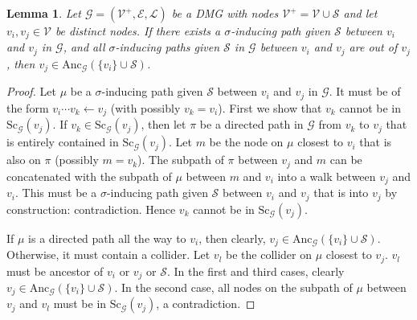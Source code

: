 \documentclass[accepted]{uai2025} %
\newtheorem{lemma}{Lemma}
\newcommand{\anc}{\text{Anc}}
\newcommand{\hut}{\mathrel{\leftarrow}}
\begin{document}
\begin{lemma}\label{lemma12.2.5}
Let $\mathcal{G}=(\mathcal{V}^+,\mathcal{E},\mathcal{L})$ be a DMG with nodes $\mathcal{V}^+=\mathcal{V}\cup\mathcal{S}$ and let $v_i,v_j\in\mathcal{V}$ be distinct nodes. If there exists a $\sigma$-inducing path given $\mathcal{S}$ between $v_i$ and $v_j$ in $\mathcal{G}$, and all $\sigma$-inducing paths given $\mathcal{S}$ in $\mathcal{G}$ between $v_i$ and $v_j$ are out of $v_j$, then $v_j\in \anc_\mathcal{G}(\{v_i\}\cup\mathcal{S})$.
\end{lemma}
\begin{proof}
Let $\mu$ be a $\sigma$-inducing path given $\mathcal{S}$ between $v_i$ and $v_j$ in $\mathcal{G}$. 
It must be of the form $v_i \cdots v_k \hut v_j$ (with possibly $v_k = v_i$). 
First we show that $v_k$ cannot be in $\text{Sc}_\mathcal{G}(v_j)$.
If $v_k \in \text{Sc}_\mathcal{G}(v_j)$, then let $\pi$ be a directed path in $\mathcal{G}$ from $v_k$ to $v_j$ that is entirely contained in $\text{Sc}_\mathcal{G}(v_j)$.
Let $m$ be the node on $\mu$ closest to $v_i$ that is also on $\pi$ (possibly $m = v_k$).
The subpath of $\pi$ between $v_j$ and $m$ can be concatenated with the subpath of $\mu$ between $m$ and $v_i$ into a walk between $v_j$ and $v_i$.
This must be a $\sigma$-inducing path given $\mathcal{S}$ between $v_i$ and $v_j$ that is into $v_j$ by construction: contradiction.
Hence $v_k$ cannot be in $\text{Sc}_\mathcal{G}(v_j)$.

If $\mu$ is a directed path all the way to $v_i$, then clearly, $v_j \in \anc_\mathcal{G}(\{v_i\} \cup \mathcal{S})$.
Otherwise, it must contain a collider.
Let $v_l$ be the collider on $\mu$ closest to $v_j$.
$v_l$ must be ancestor of $v_i$ or $v_j$ or $\mathcal{S}$.
In the first and third cases, clearly $v_j \in \anc_\mathcal{G}(\{v_i\} \cup \mathcal{S})$.
In the second case, all nodes on the subpath of $\mu$ between $v_j$ and $v_l$ must be in $\text{Sc}_\mathcal{G}(v_j)$, a contradiction.
\end{proof}
\end{document}
